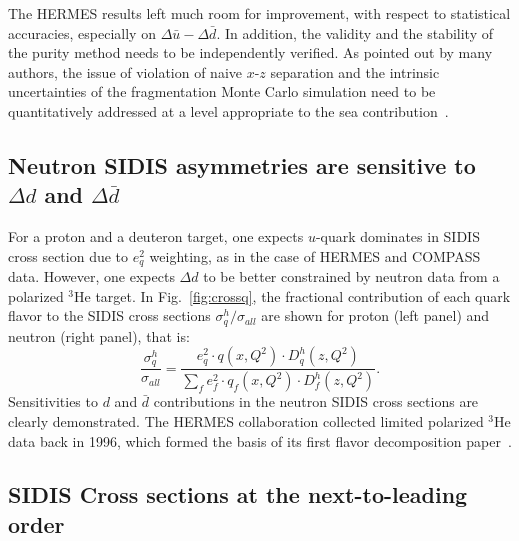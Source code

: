 The HERMES results left much room for improvement, with respect to statistical accuracies, 
especially on $\Delta \bar{u}- \Delta \bar{d}$.
In addition, the validity and the stability of the \lo purity method needs 
to be independently verified. As pointed out by many authors, the issue of
\lo violation of naive $x$-$z$ separation and the intrinsic uncertainties of the 
fragmentation Monte Carlo simulation need to be quantitatively addressed
at a level appropriate to the sea contribution~\cite{leader2}.




\subsection{Neutron SIDIS asymmetries are sensitive to $\Delta d$ and $\Delta \bar{d}$}
For a proton and a deuteron target, one expects $u$-quark dominates in SIDIS cross section 
due to $e_q^2$ weighting, as in the case of HERMES and COMPASS data. However,  
one expects $\Delta d$ to be better constrained by neutron data from a polarized $^3$He target.
In Fig.~\ref{fig:crossq}, the fractional contribution of each quark flavor 
to the SIDIS cross sections $\sigma_q^h/\sigma_{all}$ are shown for proton (left panel) and neutron (right panel),
 that is:
\begin{equation}
{\frac{\sigma_q^h}{\sigma_{all}}}= {\frac{e_q^2 \cdot q(x,Q^2) \cdot D_q^h(z,Q^2)} {\sum_f e_f^2 \cdot  q_f(x,Q^2)\cdot D_f^h(z,Q^2)}}.
\end{equation} 
Sensitivities to $d$ and $\bar{d}$ contributions in the neutron SIDIS cross sections are clearly demonstrated.
 The HERMES collaboration collected limited polarized $^3$He data back
in 1996, which formed the basis of its first flavor decomposition paper~\cite{hermes99}.   

\subsection{SIDIS Cross sections at the next-to-leading order}


